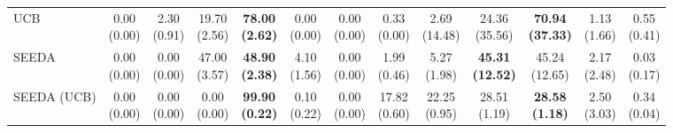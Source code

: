 \begin{table}[H]
{\begin{tabular}{l|cccccc|cccccc}
UCB & \makecell{0.00 \\ (0.00)} & \makecell{2.30 \\ (0.91)} & {\cellcolor[HTML]{C8E6C9}} \makecell{19.70 \\ (2.56)} & \bfseries \makecell{78.00 \\ (2.62)} & \makecell{0.00 \\ (0.00)} & \makecell{0.00 \\ (0.00)} & \makecell{0.33 \\ (0.00)} & \makecell{2.69 \\ (14.48)} & {\cellcolor[HTML]{C8E6C9}} \makecell{24.36 \\ (35.56)} & \bfseries \makecell{70.94 \\ (37.33)} & \makecell{1.13 \\ (1.66)} & \makecell{0.55 \\ (0.41)} \\
SEEDA & \makecell{0.00 \\ (0.00)} & \makecell{0.00 \\ (0.00)} & {\cellcolor[HTML]{C8E6C9}} \makecell{47.00 \\ (3.57)} & \bfseries \makecell{48.90 \\ (2.38)} & \makecell{4.10 \\ (1.56)} & \makecell{0.00 \\ (0.00)} & \makecell{1.99 \\ (0.46)} & \makecell{5.27 \\ (1.98)} & {\cellcolor[HTML]{C8E6C9}} \bfseries \makecell{45.31 \\ (12.52)} & \makecell{45.24 \\ (12.65)} & \makecell{2.17 \\ (2.48)} & \makecell{0.03 \\ (0.17)} \\
SEEDA (UCB) & \makecell{0.00 \\ (0.00)} & \makecell{0.00 \\ (0.00)} & {\cellcolor[HTML]{C8E6C9}} \makecell{0.00 \\ (0.00)} & \bfseries \makecell{99.90 \\ (0.22)} & \makecell{0.10 \\ (0.22)} & \makecell{0.00 \\ (0.00)} & \makecell{17.82 \\ (0.60)} & \makecell{22.25 \\ (0.95)} & {\cellcolor[HTML]{C8E6C9}} \makecell{28.51 \\ (1.19)} & \bfseries \makecell{28.58 \\ (1.18)} & \makecell{2.50 \\ (3.03)} & \makecell{0.34 \\ (0.04)} \\

\end{tabular}}
\end{table}

